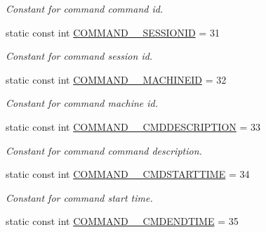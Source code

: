 \begin{DoxyCompactItemize}
\begin{DoxyCompactList}\small\item\em Constant for command command id. \item\end{DoxyCompactList}\item 
\hypertarget{classUMS__Data_1_1UMS__DataPackage_ae1959c1bd3868faaa9ba22adc24c9646}{
static const int \hyperlink{classUMS__Data_1_1UMS__DataPackage_ae1959c1bd3868faaa9ba22adc24c9646}{COMMAND\_\-\_\-SESSIONID} = 31}
\label{classUMS__Data_1_1UMS__DataPackage_ae1959c1bd3868faaa9ba22adc24c9646}

\begin{DoxyCompactList}\small\item\em Constant for command session id. \item\end{DoxyCompactList}\item 
\hypertarget{classUMS__Data_1_1UMS__DataPackage_a84cf5ed3f59007f891167c33f1e02a1c}{
static const int \hyperlink{classUMS__Data_1_1UMS__DataPackage_a84cf5ed3f59007f891167c33f1e02a1c}{COMMAND\_\-\_\-MACHINEID} = 32}
\label{classUMS__Data_1_1UMS__DataPackage_a84cf5ed3f59007f891167c33f1e02a1c}

\begin{DoxyCompactList}\small\item\em Constant for command machine id. \item\end{DoxyCompactList}\item 
\hypertarget{classUMS__Data_1_1UMS__DataPackage_a5b4fbd2785244819ad56fb38ee5312df}{
static const int \hyperlink{classUMS__Data_1_1UMS__DataPackage_a5b4fbd2785244819ad56fb38ee5312df}{COMMAND\_\-\_\-CMDDESCRIPTION} = 33}
\label{classUMS__Data_1_1UMS__DataPackage_a5b4fbd2785244819ad56fb38ee5312df}

\begin{DoxyCompactList}\small\item\em Constant for command command description. \item\end{DoxyCompactList}\item 
\hypertarget{classUMS__Data_1_1UMS__DataPackage_a2a80c81a86dad3990b07d3247b9668c5}{
static const int \hyperlink{classUMS__Data_1_1UMS__DataPackage_a2a80c81a86dad3990b07d3247b9668c5}{COMMAND\_\-\_\-CMDSTARTTIME} = 34}
\label{classUMS__Data_1_1UMS__DataPackage_a2a80c81a86dad3990b07d3247b9668c5}

\begin{DoxyCompactList}\small\item\em Constant for command start time. \item\end{DoxyCompactList}\item 
\hypertarget{classUMS__Data_1_1UMS__DataPackage_a31f2a8f4e34929716392edad8a0b7d3b}{
static const int \hyperlink{classUMS__Data_1_1UMS__DataPackage_a31f2a8f4e34929716392edad8a0b7d3b}{COMMAND\_\-\_\-CMDENDTIME} = 35}
\label{classUMS__Data_1_1UMS__DataPackage_a31f2a8f4e34929716392edad8a0b7d3b}


\end{DoxyCompactItemize}
